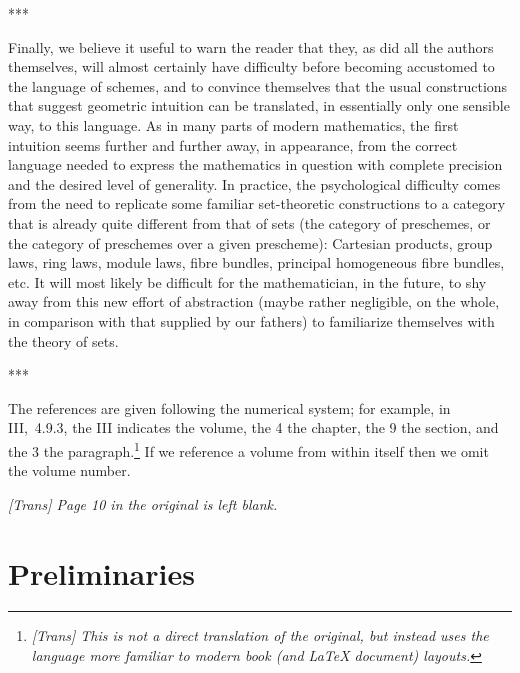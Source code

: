 \documentclass[openany,oneside]{amsbook}
\theoremstyle{ega-env-style}
\theoremstyle{ega-thm-env-style}
\theoremstyle{ega-defn-env-style}
\newcommand{\oldpage}[2][--]{{\marginpar{\textbf{#1}~|~#2}}\ignorespaces}
\def\sectionbreak{\begin{center}***\end{center}}
\begin{document}
\sectionbreak

Finally, we believe it useful to warn the reader that they, as did all the authors themselves, will almost certainly have difficulty before becoming accustomed to the language of schemes, and to convince themselves that the usual constructions that suggest geometric intuition can be translated, in essentially only one sensible way, to this language.
As in many parts of modern mathematics, the first intuition seems further and further away, in appearance, from the correct language needed to express the mathematics in question with complete precision and the desired level of generality.
In practice, the psychological difficulty comes from the need to replicate some familiar set-theoretic constructions to a category that is already quite different from that of sets (the category of preschemes, or the category of preschemes over a given prescheme): Cartesian products, group laws, ring laws, module laws, fibre bundles, principal homogeneous fibre bundles, etc.
It will most likely be difficult for the mathematician, in the future, to shy away from this new effort of abstraction (maybe rather negligible, on the whole, in comparison with that supplied by our fathers) to familiarize themselves with the theory of sets.

\sectionbreak

The references are given following the numerical system; for example, in III,~4.9.3, the III indicates the volume, the 4 the chapter, the 9 the section, and the 3 the paragraph.\footnote{\emph{[Trans] This is not a direct translation of the original, but instead uses the language more familiar to modern book (and LaTeX document) layouts.}}
If we reference a volume from within itself then we omit the volume number.

\bigskip

\oldpage[I]{10}
\emph{[Trans] Page 10 in the original is left blank.}




\setcounter{chapter}{-1}\chapter{Preliminaries}

\label{section-phantom}










\end{document}
